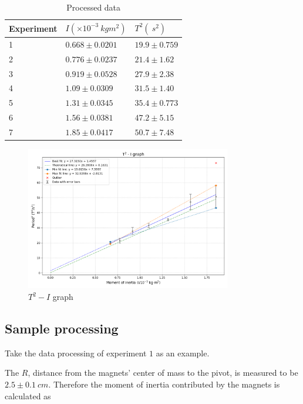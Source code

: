 \documentclass[a4paper]{article}
\begin{document}
\begin{table}[ht]
\centering
\caption{Processed data}
\label{tab.proc}
\begin{tabular}{lll}
\hline \hline
Experiment & $I(\times 10^{-3}\SI{}{kgm^2})$ & $T^2(\SI{}{s^2})$ \\ \hline
1          & $0.668\pm 0.0201$               & $19.9\pm0.759$    \\
2          & $0.776\pm 0.0237$               & $21.4\pm1.62$     \\
3          & $0.919\pm 0.0528$               & $27.9\pm2.38$     \\
4          & $1.09\pm 0.0309$                & $31.5\pm1.40$     \\
5          & $1.31\pm 0.0345$                & $35.4\pm0.773$    \\
6          & $1.56\pm 0.0381$                & $47.2\pm5.15$     \\
7          & $1.85\pm 0.0417$                & $50.7\pm7.48$     \\ \hline \hline
\end{tabular}
\end{table}

\begin{figure}[ht]
    \centering
    \includegraphics[width = 0.8\textwidth]{grapha.png}
    \caption{$T^2 - I$ graph}
    \label{fig.processedd}
\end{figure}

\subsection{Sample processing}

Take the data processing of experiment $1$ as an example. 

The $R$, distance from the magnets' center of mass to the pivot, is measured to be $2.5\pm 0.1\SI{}{cm}$. Therefore the moment of inertia contributed by the magnets is calculated as 
\end{document}
